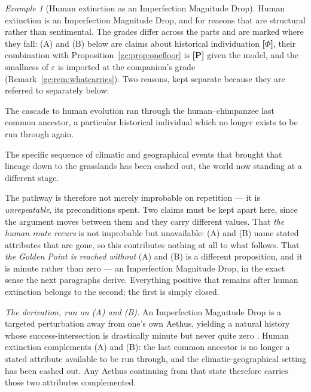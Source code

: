 \documentclass[11pt]{article}
\numberwithin{equation}{section}
\theoremstyle{plain}
\theoremstyle{definition}
\theoremstyle{remark}
\newtheorem{example}[theorem]{Example}
\begin{document}
\begin{example}[Human extinction as an Imperfection Magnitude Drop]
\label{gc:ex:humanIMD}
Human extinction is an Imperfection Magnitude Drop, and for reasons
that are structural rather than sentimental. The grades differ across
the parts and are marked where they fall: (A) and (B) below are claims
about historical individuation \textbf{[$\Phi$]}, their combination
with Proposition~\ref{gc:prop:onefloor} is \textbf{[P]} given the
model, and the smallness of $\varepsilon$ is imported at the
companion's grade (Remark~\ref{gc:rem:whatcarries}). Two reasons, kept
separate because they are referred to separately below:

\begin{description}\itemsep2pt
\item[\normalfont(A) \emph{The lineage is spent.}] The cascade to human
evolution ran through the human--chimpanzee last common ancestor, a
particular historical individual which no longer exists to be run
through again.
\item[\normalfont(B) \emph{The setting is spent.}] The specific sequence
of climatic and geographical events that brought that lineage down to
the grasslands has been cashed out, the world now standing at a
different stage.
\end{description}

\noindent The pathway is therefore not merely improbable on repetition
--- it is \emph{unrepeatable}, its preconditions spent. Two claims must be kept apart here, since the argument moves between
them and they carry different values. That \emph{the human route
recurs} is not improbable but unavailable: (A) and (B) name stated
attributes that are gone, so this contributes nothing at all to what
follows. That \emph{the Golden Point is reached without} (A) and (B) is
a different proposition, and it is minute rather than zero --- an
Imperfection Magnitude Drop, in the exact sense the next paragraphs
derive. Everything positive that remains after human extinction belongs
to the second; the first is simply closed.

\emph{The derivation, run on (A) and (B).} An Imperfection Magnitude
Drop is a targeted perturbation away from one's own Aethus, yielding a
natural history whose success-intersection is drastically minute but
never quite zero \cite[\S IMD]{Nexus}. Human extinction complements (A)
and (B): the last common ancestor is no longer a stated attribute
available to be run through, and the climatic-geographical setting has
been cashed out. Any Aethus continuing from that state therefore
carries those two attributes complemented.


\end{example}
\end{document}
